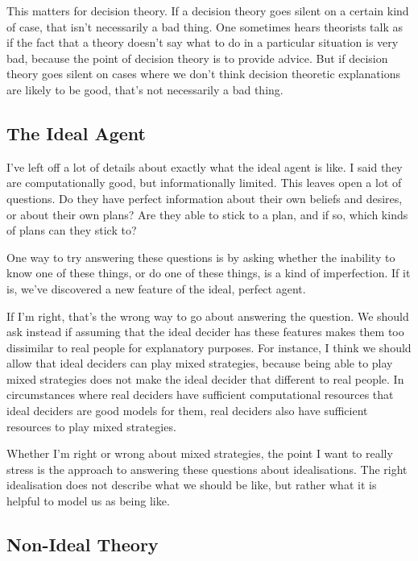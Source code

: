 \documentclass[
  10pt,
  letterpaper,
  DIV=11,
  numbers=noendperiod,
  twoside]{scrartcl}
\begin{document}
This matters for decision theory. If a decision theory goes silent on a
certain kind of case, that isn't necessarily a bad thing. One sometimes
hears theorists talk as if the fact that a theory doesn't say what to do
in a particular situation is very bad, because the point of decision
theory is to provide advice. But if decision theory goes silent on cases
where we don't think decision theoretic explanations are likely to be
good, that's not necessarily a bad thing.

\subsection{The Ideal Agent}\label{the-ideal-agent}

I've left off a lot of details about exactly what the ideal agent is
like. I said they are computationally good, but informationally limited.
This leaves open a lot of questions. Do they have perfect information
about their own beliefs and desires, or about their own plans? Are they
able to stick to a plan, and if so, which kinds of plans can they stick
to?

One way to try answering these questions is by asking whether the
inability to know one of these things, or do one of these things, is a
kind of imperfection. If it is, we've discovered a new feature of the
ideal, perfect agent.

If I'm right, that's the wrong way to go about answering the question.
We should ask instead if assuming that the ideal decider has these
features makes them too dissimilar to real people for explanatory
purposes. For instance, I think we should allow that ideal deciders can
play mixed strategies, because being able to play mixed strategies does
not make the ideal decider that different to real people. In
circumstances where real deciders have sufficient computational
resources that ideal deciders are good models for them, real deciders
also have sufficient resources to play mixed strategies.

Whether I'm right or wrong about mixed strategies, the point I want to
really stress is the approach to answering these questions about
idealisations. The right idealisation does not describe what we should
be like, but rather what it is helpful to model us as being like.

\subsection{Non-Ideal Theory}\label{non-ideal-theory}
\end{document}
